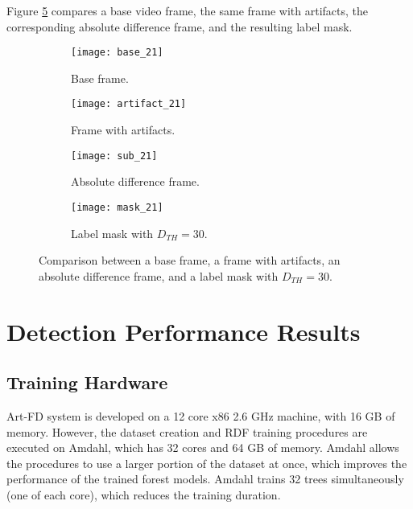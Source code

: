 Figure \ref{fig:mask_cmp} compares a base video frame, the same frame with artifacts, the corresponding absolute difference frame, and the resulting label mask.

\begin{figure} [!h]
  \centering
  
  \begin{subfigure}[t]{0.49\textwidth}
    \centering
    \texttt{[image: base\_21]}
    \caption{Base frame.}
    \label{fig:mask_cmp.a}
  \end{subfigure}
  \hfill
  \begin{subfigure}[t]{0.49\textwidth}
    \centering
    \texttt{[image: artifact\_21]}
    \caption{Frame with artifacts.}
    \label{fig:mask_cmp.b}
  \end{subfigure}
  \begin{subfigure}[t]{0.49\textwidth}
    \centering
    \texttt{[image: sub\_21]}
    \caption{Absolute difference frame.}
    \label{fig:mask_cmp.c}
  \end{subfigure}
  \hfill
  \begin{subfigure}[t]{0.49\textwidth}
    \centering
    \texttt{[image: mask\_21]}
    \caption{Label mask with $D_{TH} = 30$.}
    \label{fig:mask_cmp.d}
  \end{subfigure}

  \caption{Comparison between a base frame, a frame with artifacts, an absolute difference frame, and a label mask with $D_{TH}=30$.}
  \label{fig:mask_cmp}

\end{figure}

\section{Detection Performance Results}
\label{sec:res_detection}


\subsection{Training Hardware}
\label{sec:res_hw}

Art-FD system is developed on a 12 core x86 2.6 GHz machine, with 16 GB of memory. However, the dataset creation and RDF training procedures are executed on Amdahl, which has 32 cores and 64 GB of memory. Amdahl allows the procedures to use a larger portion of the dataset at once, which improves the performance of the trained forest models. Amdahl trains 32 trees simultaneously (one of each core), which reduces the training duration.

